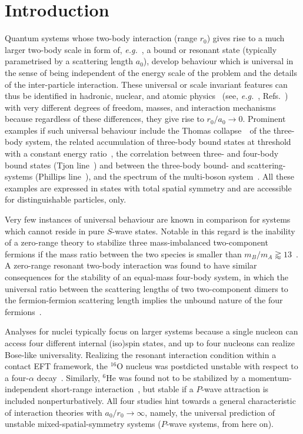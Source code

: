 \documentclass[preprint,12pt]{elsarticle}
\newcommand{\eg}{\textit{e.g.}~}
\begin{document}

\section{Introduction}

Quantum systems whose two-body interaction (range $r_0$) gives rise to a much larger two-body scale in form of, \eg,
a bound or resonant state (typically parametrised by a scattering length $a_0$),
develop behaviour which is universal in the sense of being independent of the energy scale of the problem and
the details of the inter-particle interaction.
These universal or scale invariant features can thus be identified in hadronic, nuclear, and atomic physics ~(see, \eg,
Refs.~\cite{Tornqvist:1991ks,Voloshin:2003nt,Braaten:2003he,philli,tjon,PhysRevLett.81.69}) with very different degrees of freedom,
masses, and interaction mechanisms because regardless of these differences, they give rise to $r_0/a_0\to0$.
Prominent examples if such universal behaviour include the Thomas collapse~\cite{PhysRev.47.903}~of the three-body system,
the related accumulation of three-body bound states at threshold with a constant energy ratio~\cite{Efimov:1971zz},
the correlation between three- and four-body bound states (Tjon line~\cite{tjon}) and between the three-body bound- and
scattering-systems (Phillips line~\cite{philli}), and the spectrum of the multi-boson system~\cite{manybosons}.
All these examples are expressed in states with total spatial symmetry and are accessible for distinguishable particles, only.

Very few instances of universal behaviour are known in comparison for systems which cannot reside in pure $S$-wave states.
Notable in this regard is the inability of a zero-range theory to stabilize three mass-imbalanced two-component fermions
if the mass ratio between the two species is smaller than $m_B/m_A \gtrapprox 13 $~\cite{Kartavtsev_2007}.
A zero-range resonant two-body interaction was found to have similar consequences for the stability of an equal-mass four-body system,
in which the universal ratio between the scattering lengths of two two-component dimers to the fermion-fermion scattering length
implies the unbound nature of the four fermions~\cite{petrov_dimerov, Petrov:2005zz,PhysRevA.92.053624}.

Analyses for nuclei typically focus on larger systems because a single nucleon can access four different internal (iso)spin states,
and up to four nucleons can realize Bose-like universality.
Realizing the resonant interaction condition within a contact EFT framework, the $^{16}$O nucleus was postdicted unstable
with respect to a four-$\alpha$ decay~\cite{Contessi:2017rww}.
Similarly, $^{6}$He was found not to be stabilized by a momentum-independent short-range interaction~\cite{Gattobigio:2019omi},
but stable if a $P$-wave attraction is included nonperturbatively.
All four studies hint towards a general characteristic of interaction theories with $a_0/r_0\rightarrow \infty$, namely,
the universal prediction of unstable mixed-spatial-symmetry systems ($P$-wave systems, from here on).
\end{document}
